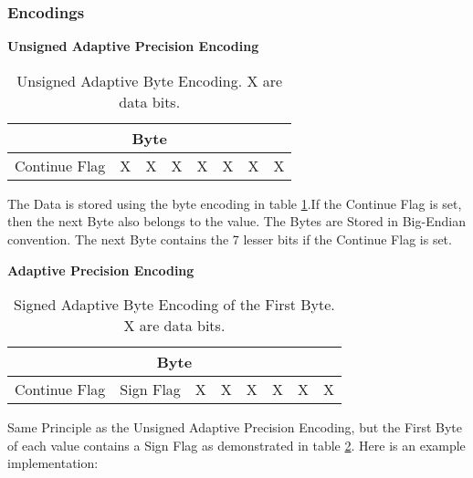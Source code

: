 \subsubsection*{Encodings} \label{anhang:format:encodings}
\textbf{Unsigned Adaptive Precision Encoding}\\
\begin{table}[!htbp]
	\center
	\begin{tabular}{|c|c|c|c||c|c|c|c|}
	\hline
	\multicolumn{8}{|c|}{Byte}\\\hline
	Continue Flag & X & X & X & X & X & X & X \\\hline
	\end{tabular}
	\caption{Unsigned Adaptive Byte Encoding. X are data bits.}
	\label{anhang:format:encodings:adaptiveUnsigned}
\end{table}
The Data is stored using the byte encoding in table \ref{anhang:format:encodings:adaptiveUnsigned}.If the Continue Flag is set, then the next Byte also belongs to the value. The Bytes are Stored in Big-Endian\cite{wiki:endianess} convention. The next Byte contains the 7 lesser bits if the Continue Flag is set.

\textbf{Adaptive Precision Encoding}\\
\begin{table}[!htbp]
	\center
	\begin{tabular}{|c|c|c|c||c|c|c|c|}
	\hline
	\multicolumn{8}{|c|}{Byte}\\\hline
	Continue Flag & Sign Flag & X & X & X & X & X & X \\\hline
	\end{tabular}
	\caption{Signed Adaptive Byte Encoding of the First Byte.  X are data bits.}
	\label{anhang:format:encodings:adaptive}
\end{table}
Same Principle as the Unsigned Adaptive Precision Encoding, but the First Byte of each value contains a Sign Flag as demonstrated in table \ref{anhang:format:encodings:adaptive}. Here is an example implementation:\\


